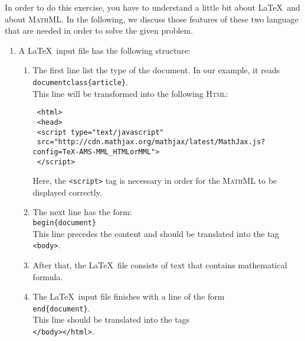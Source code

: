 In order to do this exercise, you have to understand a little bit about \LaTeX\ and about 
\textsc{MathML}.  In the following, we discuss those features of these two language that are needed in order to
solve the given problem.
\begin{enumerate}
\item A \LaTeX\ input file has the following structure:
      \begin{enumerate}
      \item The first line list the type of the document.  In our example, it reads
            \\[0.2cm]
            \hspace*{1.3cm}
            \texttt{documentclass\{article\}}.
            \\[0.2cm]
            This line will be transformed into the following \textsc{Html}:
            \begin{verbatim}
 <html>
 <head>
 <script type="text/javascript"
 src="http://cdn.mathjax.org/mathjax/latest/MathJax.js?config=TeX-AMS-MML_HTMLorMML">
 </script>
            \end{verbatim}
            Here, the \texttt{<script>} tag is necessary in order for the \textsc{MathML} 
            to be displayed correctly.
      \item The next line has the form:
            \\[0.2cm]
            \hspace*{1.3cm}
            \texttt{begin\{document\}}
            \\[0.2cm]
            This line precedes the content and should be translated into the tag
            \\[0.2cm]
            \hspace*{1.3cm}
            \texttt{<body>}.
      \item After that, the \LaTeX\ file consists of text that contains mathematical formula.
      \item The \LaTeX\ input file finishes with a line of the form
            \\[0.2cm]
            \hspace*{1.3cm}
            \texttt{end\{document\}}.
            \\[0.2cm]
            This line should be translated into the tags
            \\[0.2cm]
            \hspace*{1.3cm}
            \texttt{</body></html>}.
      \end{enumerate}

\end{enumerate}
